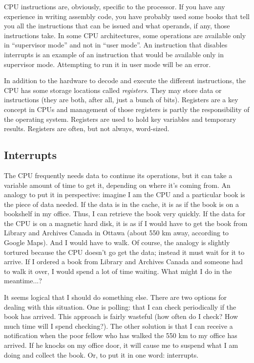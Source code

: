 CPU instructions are, obviously, specific to the processor. If you have any experience in writing assembly code, you have probably used some books that tell you all the instructions that can be issued and what operands, if any, those instructions take. In some CPU architectures, some operations are available only in ``supervisor mode'' and not in ``user mode''. An instruction that disables interrupts is an example of an instruction that would be available only in supervisor mode. Attempting to run it in user mode will be an error.

In addition to the hardware to decode and execute the different instructions, the CPU has some storage locations called \textit{registers}. They may store data or instructions (they are both, after all, just a bunch of bits). Registers are a key concept in CPUs and management of those registers is partly the responsibility of the operating system. Registers are used to hold key variables and temporary results. Registers are often, but not always, word-sized.


\subsection*{Interrupts}

The CPU frequently needs data to continue its operations, but it can take a variable amount of time to get it, depending on where it's coming from. An analogy to put it in perspective: imagine I am the CPU and a particular book is the piece of data needed. If the data is in the cache, it is as if the book is on a bookshelf in my office. Thus, I can retrieve the book very quickly. If the data for the CPU is on a magnetic hard disk, it is as if I would have to get the book from Library and Archives Canada in Ottawa (about 550 km away, according to Google Maps). And I would have to walk. Of course, the analogy is slightly tortured because the CPU doesn't go get the data; instead it must wait for it to arrive. If I ordered a book from Library and Archives Canada and someone had to walk it over, I would spend a lot of time waiting. What might I do in the meantime...?

It seems logical that I should do something else. There are two options for dealing with this situation. One is polling: that I can check periodically if the book has arrived. This approach is fairly wasteful (how often do I check? How much time will I spend checking?). The other solution is that I can receive a notification when the poor fellow who has walked the 550 km to my office has arrived. If he knocks on my office door, it will cause me to suspend what I am doing and collect the book. Or, to put it in one word: interrupts.

